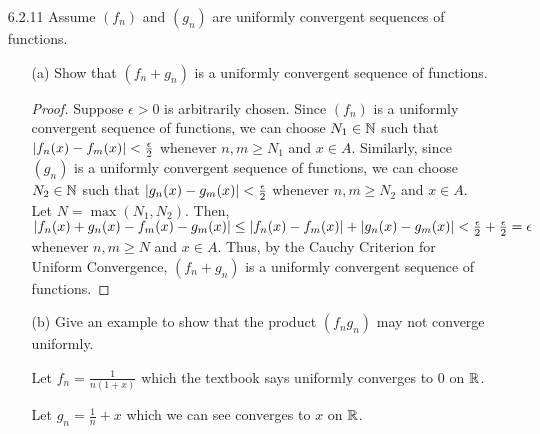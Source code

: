 \documentclass[12pt,letterpaper]{article}
\begin{document}
    \begin{itemize}[leftmargin=!,labelindent=5pt]
        \item [6.2.11] Assume $(f_n)$ and $(g_n)$ are uniformly convergent sequences of functions.
            \begin{itemize}
                \item [(a)] Show that $(f_n + g_n)$ is a uniformly convergent sequence of functions.
                    \begin{proof}
                        Suppose $\epsilon > 0$ is arbitrarily chosen.
                        Since $(f_n)$ is a uniformly convergent sequence of functions, we can choose $N_1 \in \mathbb{N}$ such that $\abs{f_n(x) - f_m(x)} < \frac{\epsilon}{2}$ whenever $n,m \geq N_1$ and $x \in A$.
                        Similarly, since $(g_n)$ is a uniformly convergent sequence of functions, we can choose $N_2 \in \mathbb{N}$ such that $\abs{g_n(x) - g_m(x)} < \frac{\epsilon}{2}$ whenever $n,m \geq N_2$ and $x \in A$.
                        Let $N = \max(N_1, N_2)$.
                        Then, $\abs{f_n(x) + g_n(x) - f_m(x) - g_m(x)} \leq \abs{f_n(x) - f_m(x)} + \abs{g_n(x) - g_m(x)} < \frac{\epsilon}{2} + \frac{\epsilon}{2} = \epsilon$ whenever $n,m \geq N$ and $x \in A$.
                        Thus, by the Cauchy Criterion for Uniform Convergence, $(f_n + g_n)$ is a uniformly convergent sequence of functions.
                    \end{proof}
                \item [(b)] Give an example to show that the product $(f_n g_n)$ may not converge uniformly.
                
                    Let $f_n = \frac{1}{n(1+x)}$ which the textbook says uniformly converges to $0$ on $\mathbb{R}$.

                    Let $g_n = \frac{1}{n} + x$ which we can see converges to $x$ on $\mathbb{R}$.


\end{itemize}
\end{itemize}
\end{document}
